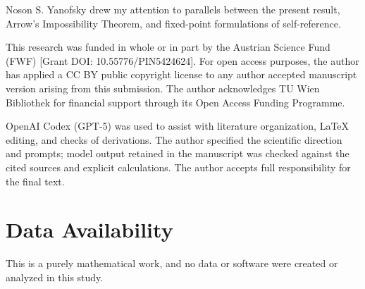 \documentclass[aps,pra,reprint,superscriptaddress,amsmath,amssymb]{revtex4-2}
\theoremstyle{plain}
\theoremstyle{definition}
\theoremstyle{remark}
\begin{document}
\begin{acknowledgments}
Noson S. Yanofsky drew my attention to parallels between the present result,
Arrow's Impossibility Theorem, and fixed-point formulations of
self-reference.

This research was funded in whole or in part by the Austrian Science Fund
(FWF) [Grant DOI: 10.55776/PIN5424624]. For open access purposes, the author
has applied a CC BY public copyright license to any author accepted manuscript
version arising from this submission. The author acknowledges TU Wien
Bibliothek for financial support through its Open Access Funding Programme.

OpenAI Codex (GPT-5) was used to assist with literature organization, LaTeX
editing, and checks of derivations. The author specified the scientific
direction and prompts; model output retained in the manuscript was checked
against the cited sources and explicit calculations. The author accepts full
responsibility for the final text.
\end{acknowledgments}

\section*{Data Availability}
This is a purely mathematical work, and no data or software were created or
analyzed in this study.


\end{document}
